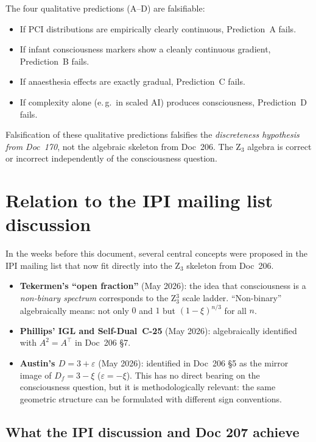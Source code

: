 The four qualitative predictions (A--D) are falsifiable:

\begin{itemize}
\item If PCI distributions are empirically clearly continuous, Prediction~A fails.
\item If infant consciousness markers show a cleanly continuous gradient, Prediction~B fails.
\item If anaesthesia effects are exactly gradual, Prediction~C fails.
\item If complexity alone (e.\,g.\ in scaled AI) produces consciousness, Prediction~D fails.
\end{itemize}

\begin{interpretation}
Falsification of these qualitative predictions falsifies the \emph{discreteness hypothesis from Doc~170}, not the algebraic skeleton from Doc~206. The Z$_3$ algebra is correct or incorrect independently of the consciousness question.
\end{interpretation}

\section{Relation to the IPI mailing list discussion}\label{sec:ipi}

In the weeks before this document, several central concepts were proposed in the IPI mailing list that now fit directly into the Z$_3$ skeleton from Doc~206.

\begin{itemize}
\item \textbf{Tekermen's ``open fraction''} (May 2026): the idea that consciousness is a \emph{non-binary spectrum} corresponds to the Z$_3^3$ scale ladder. ``Non-binary'' algebraically means: not only $0$ and $1$ but $(1-\xi)^{n/3}$ for all $n$.
\item \textbf{Phillips' IGL and Self-Dual~C-25} (May 2026): algebraically identified with $A^2 = A^\top$ in Doc~206 \S7.
\item \textbf{Austin's $D = 3 + \varepsilon$} (May 2026): identified in Doc~206 \S5 as the mirror image of $D_f = 3 - \xi$ ($\varepsilon = -\xi$). This has no direct bearing on the consciousness question, but it is methodologically relevant: the same geometric structure can be formulated with different sign conventions.
\end{itemize}

\subsection{What the IPI discussion and Doc 207 achieve}

